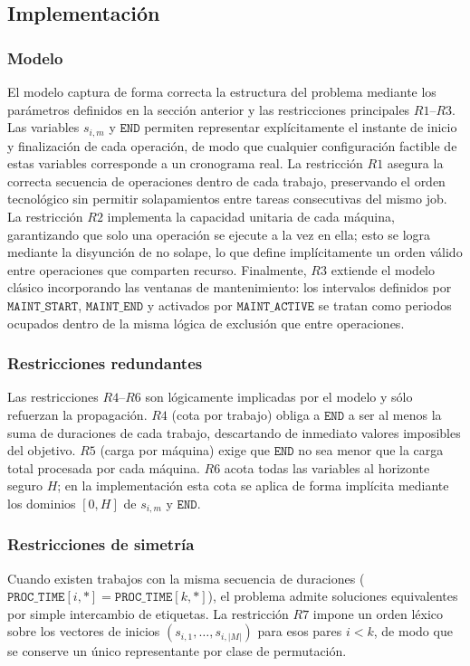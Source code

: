 
\subsection{Implementación}\label{sec:01-jobshop_mantenimiento-implementacion}

\subsubsection*{Modelo}
El modelo captura de forma correcta la estructura del problema mediante los parámetros definidos en la sección anterior y las restricciones principales \(R1\)–\(R3\).  
Las variables \(s_{i,m}\) y \(\texttt{END}\) permiten representar explícitamente el instante de inicio y finalización de cada operación, de modo que cualquier configuración factible de estas variables corresponde a un cronograma real.  
La restricción \(R1\) asegura la correcta secuencia de operaciones dentro de cada trabajo, preservando el orden tecnológico sin permitir solapamientos entre tareas consecutivas del mismo job.  
La restricción \(R2\) implementa la capacidad unitaria de cada máquina, garantizando que solo una operación se ejecute a la vez en ella; esto se logra mediante la disyunción de no solape, lo que define implícitamente un orden válido entre operaciones que comparten recurso.  
Finalmente, \(R3\) extiende el modelo clásico incorporando las ventanas de mantenimiento: los intervalos definidos por \(\texttt{MAINT\_START}\), \(\texttt{MAINT\_END}\) y activados por \(\texttt{MAINT\_ACTIVE}\) se tratan como periodos ocupados dentro de la misma lógica de exclusión que entre operaciones.

\subsubsection*{Restricciones redundantes}
Las restricciones \(R4\)–\(R6\) son lógicamente implicadas por el modelo y sólo refuerzan la propagación.  
\(R4\) (cota por trabajo) obliga a \(\texttt{END}\) a ser al menos la suma de duraciones de cada trabajo, descartando de inmediato valores imposibles del objetivo.  
\(R5\) (carga por máquina) exige que \(\texttt{END}\) no sea menor que la carga total procesada por cada máquina.  
\(R6\) acota todas las variables al horizonte seguro \(H\); en la implementación esta cota se aplica de forma implícita mediante los dominios \([0,H]\) de \(s_{i,m}\) y \(\texttt{END}\).

\subsubsection*{Restricciones de simetría}
Cuando existen trabajos con la misma secuencia de duraciones (\(\texttt{PROC\_TIME}[i,*]=\texttt{PROC\_TIME}[k,*]\)), el problema admite soluciones equivalentes por simple intercambio de etiquetas.  
La restricción \(R7\) impone un orden léxico sobre los vectores de inicios \((s_{i,1},\dots,s_{i,|M|})\) para esos pares \(i<k\), de modo que se conserve un único representante por clase de permutación.